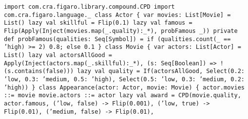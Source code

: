 \begin{flushleft}
\texttt{import com.cra.figaro.library.compound.CPD
\newline import com.cra.figaro.language.\_
\newline 
\newline class Actor \{
\newline \tab var movies: List[Movie] = List()
\newline 
\newline \tab lazy val skillful = Flip(0.1)
\newline 
\newline \tab lazy val famous =
\newline \tab Flip(Apply(Inject(movies.map(\_.quality):\_*), probFamous \_))
\newline 
\newline \tab private def probFamous(qualities: Seq[Symbol]) =
\newline \tab if (qualities.count(\_ == 'high) >= 2) 0.8; else 0.1
\newline \}
\newline 
\newline class Movie \{
\newline \tab var actors: List[Actor] = List()
\newline 
\newline \tab lazy val actorsAllGood = Apply(Inject(actors.map(\_.skillful):\_*), (s: Seq[Boolean]) => !(s.contains(false)))
\newline \tab lazy val quality = 
\newline \tab If(actorsAllGood,
\newline \tab \tab Select(0.2: 'low, 0.3: 'medium, 0.5: 'high), 
\newline \tab \tab Select(0.5: 'low, 0.3: 'medium, 0.2: 'high))
\newline \}
\newline 
\newline class Appearance(actor: Actor, movie: Movie) \{
\newline \tab actor.movies ::= movie
\newline \tab movie.actors ::= actor
\newline 
\newline lazy val award = CPD(movie.quality, actor.famous, 
\newline \tab \tab ('low, false) -> Flip(0.001), 
\newline \tab \tab ('low, true) -> Flip(0.01), 
\newline \tab \tab ('medium, false) -> Flip(0.01), 
}
\end{flushleft}
